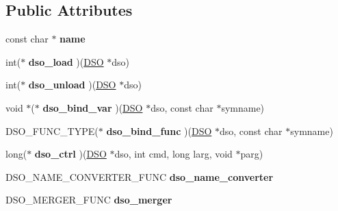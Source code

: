 \subsection*{Public Attributes}
\begin{DoxyCompactItemize}
\item 
\mbox{\label{structdso__meth__st_aef9c2213572b32054a97a99954505d6e}} 
const char $\ast$ {\bfseries name}
\item 
\mbox{\label{structdso__meth__st_ad0931e27df22d21228272993683488b8}} 
int($\ast$ {\bfseries dso\+\_\+load} )(\hyperlink{structdso__st}{D\+SO} $\ast$dso)
\item 
\mbox{\label{structdso__meth__st_a330000d54dcc81e708bc60ef31ca9daf}} 
int($\ast$ {\bfseries dso\+\_\+unload} )(\hyperlink{structdso__st}{D\+SO} $\ast$dso)
\item 
\mbox{\label{structdso__meth__st_a64e053582cae745cef5ff6643b8258cb}} 
void $\ast$($\ast$ {\bfseries dso\+\_\+bind\+\_\+var} )(\hyperlink{structdso__st}{D\+SO} $\ast$dso, const char $\ast$symname)
\item 
\mbox{\label{structdso__meth__st_a6a179a5a759e8d6837055f217848e3db}} 
D\+S\+O\+\_\+\+F\+U\+N\+C\+\_\+\+T\+Y\+PE($\ast$ {\bfseries dso\+\_\+bind\+\_\+func} )(\hyperlink{structdso__st}{D\+SO} $\ast$dso, const char $\ast$symname)
\item 
\mbox{\label{structdso__meth__st_abc9ee5fe4894fa7bd80d37e1d20393ec}} 
long($\ast$ {\bfseries dso\+\_\+ctrl} )(\hyperlink{structdso__st}{D\+SO} $\ast$dso, int cmd, long larg, void $\ast$parg)
\item 
\mbox{\label{structdso__meth__st_a02abdcfb6f66b31d697d4bdc4ec647ba}} 
D\+S\+O\+\_\+\+N\+A\+M\+E\+\_\+\+C\+O\+N\+V\+E\+R\+T\+E\+R\+\_\+\+F\+U\+NC {\bfseries dso\+\_\+name\+\_\+converter}
\item 
\mbox{\label{structdso__meth__st_a69ab12d20b8622ad9ac892e9feb29a10}} 
D\+S\+O\+\_\+\+M\+E\+R\+G\+E\+R\+\_\+\+F\+U\+NC {\bfseries dso\+\_\+merger}
\item 
\mbox{\label{structdso__meth__st_af88ab1073bac7849a6b23a0cb7df4872}} 

\end{DoxyCompactItemize}
